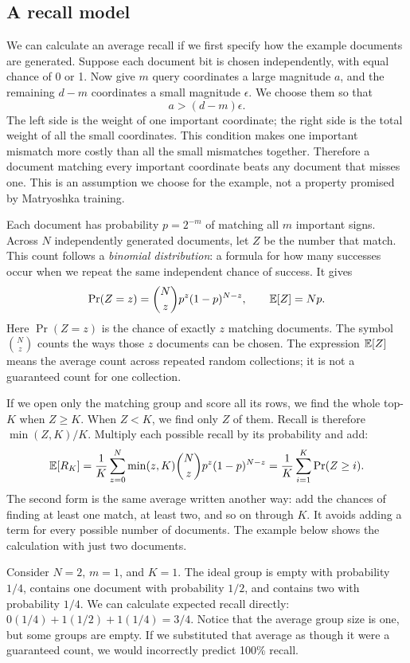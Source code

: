 \subsection{A recall model}
We can calculate an average recall if we first specify how the example documents are generated.
Suppose each document bit is chosen independently, with equal chance of 0 or 1. Now give $m$
query coordinates a large magnitude $a$, and the remaining $d-m$ coordinates a small magnitude
$\epsilon$. We choose them so that
\begin{equation}
a>(d-m)\epsilon.
\label{eq:dominance}
\end{equation}
The left side is the weight of one important coordinate; the right side is the total weight
of all the small coordinates. This condition makes one important mismatch more costly than
all the small mismatches together. Therefore a document matching every important coordinate
beats any document that misses one. This is an assumption we choose for the example, not a
property promised by Matryoshka training.

Each document has probability $p=2^{-m}$ of matching all $m$ important signs. Across $N$
independently generated documents, let $Z$ be the number that match. This count follows a
\emph{binomial distribution}: a formula for how many successes occur when we repeat the same
independent chance of success. It gives
\[
\Pr(Z=z)=\binom Nz p^z(1-p)^{N-z},\qquad \mathbb E[Z]=Np.
\]
Here $\Pr(Z=z)$ is the chance of exactly $z$ matching documents. The symbol $\binom Nz$
counts the ways those $z$ documents can be chosen. The expression $\mathbb E[Z]$ means the average
count across repeated random collections; it is not a guaranteed count for one collection.

If we open only the matching group and score all its rows, we find the whole top-$K$ when
$Z\ge K$. When $Z<K$, we find only $Z$ of them. Recall is therefore $\min(Z,K)/K$.
Multiply each possible recall by its probability and add:
\begin{equation}
\mathbb E[R_K]=\frac1K\sum_{z=0}^{N}\min(z,K)\binom Nz p^z(1-p)^{N-z}
       =\frac1K\sum_{i=1}^{K}\Pr(Z\ge i).
\label{eq:binomial-recall}
\end{equation}
The second form is the same average written another way: add the chances of finding at least
one match, at least two, and so on through $K$. It avoids adding a term for every possible
number of documents. The example below shows the calculation with just two documents.

Consider $N=2$, $m=1$, and $K=1$. The ideal group is empty with probability $1/4$, contains
one document with probability $1/2$, and contains two with probability $1/4$. We can calculate
expected recall directly: $0(1/4)+1(1/2)+1(1/4)=3/4$. Notice that the average group size is
one, but some groups are empty. If we substituted that average as though it were a guaranteed
count, we would incorrectly predict 100\% recall.

